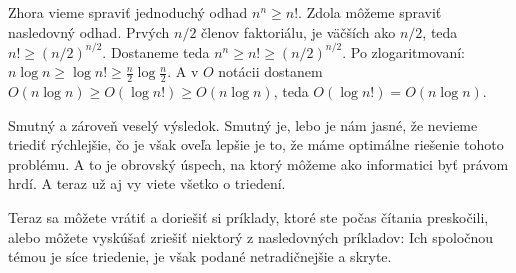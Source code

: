 Zhora vieme spraviť jednoduchý odhad $n^n \geq n!$. Zdola môžeme spraviť nasledovný odhad. Prvých
$n/2$ členov faktoriálu, je väčších ako $n/2$, teda $n! \geq (n/2)^{n/2}$.
Dostaneme teda $n^n \geq n! \geq (n/2)^{n/2}$. 
Po zlogaritmovaní: $n\log n \geq \log n! \geq \frac{n}{2} \log \frac{n}{2}$. A v $O$ notácii
dostanem $O(n\log n) \geq O(\log n!) \geq O(n\log n)$, teda $O(\log n!) = O(n \log n)$.

Smutný a zároveň veselý výsledok. Smutný je, lebo je nám jasné, že nevieme triediť rýchlejšie, čo je
však oveľa lepšie je to, že máme optimálne riešenie tohoto problému. A to je obrovský úspech, na
ktorý môžeme ako informatici byť právom hrdí. A teraz už aj vy viete všetko o triedení.

\medskip

Teraz sa môžete vrátiť a doriešiť si príklady, ktoré ste počas čítania preskočili, alebo môžete
vyskúšať zriešiť niektorý z nasledovných príkladov:
Ich spoločnou témou je síce triedenie, je však podané netradičnejšie a skryte.


